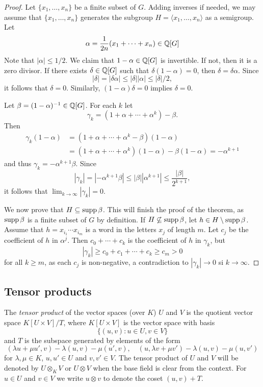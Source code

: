 \begin{proof}
	Let $\{x_1,\dots,x_n\}$ be a finite subset of $G$. Adding inverses if needed, we may assume that 
	$\{x_1,\dots,x_n\}$ generates the subgroup
	$H=\langle x_1,\dots,x_n\rangle$ as a semigroup. Let 
	\[
		\alpha=\frac{1}{2n}(x_1+\cdots+x_n)\in\mathbb{Q}[G]
	\]
    Note that $|\alpha|\leq 1/2$. 
	We claim that $1-\alpha\in\mathbb{Q}[G]$ is invertible. If not, then it is a zero divisor. If there exists 
	$\delta\in\mathbb{Q}[G]$ such that $\delta(1-\alpha)=0$, then 
	$\delta=\delta\alpha$. Since  
	\[
		|\delta|=|\delta\alpha|\leq|\delta||\alpha|\leq|\delta|/2,
	\]
	it follows that $\delta=0$. Similarly, $(1-\alpha)\delta=0$ implies
	$\delta=0$. 
	
	Let $\beta=(1-\alpha)^{-1}\in\mathbb{Q}[G]$.  For each $k$ let  
	\[
		\gamma_k=(1+\alpha+\cdots+\alpha^k)-\beta.
	\]
	Then 
	\begin{align*}
		\gamma_k(1-\alpha)&=(1+\alpha+\cdots+\alpha^k-\beta)(1-\alpha)\\
		&=(1+\alpha+\cdots+\alpha^k)(1-\alpha)-\beta(1-\alpha)=-\alpha^{k+1}
	\end{align*}
	and thus  
	$\gamma_k=-\alpha^{k+1}\beta$. Since  
	\[
		|\gamma_k|=|-\alpha^{k+1}\beta|\leq|\beta||\alpha^{k+1}|\leq\frac{|\beta|}{2^{k+1}},
	\]
	it follows that $\lim_{k\to\infty}|\gamma_k|=0$. 

	We now prove that $H\subseteq\operatorname{supp}\beta$. This will finish the proof of the theorem, 
	as $\operatorname{supp}\beta$ is a finite subset of $G$ by definition. If
	$H\not\subseteq\operatorname{supp}\beta$, let $h\in H\setminus\operatorname{supp}\beta$.  Assume that 
    $h=x_{i_1}\cdots x_{i_m}$ is a word in the letters $x_j$ of length $m$. Let 
    $c_j$ be the coefficient of $h$ in $\alpha^j$. Then $c_0+\cdots+c_k$ is the 
	coefficient of $h$ in $\gamma_k$, but 
	\[
		|\gamma_k|\geq c_0+c_1+\cdots+c_k\geq c_m>0
	\]
	for all $k\geq m$, as each $c_j$ is non-negative, a contradiction to 
	$|\gamma_k|\to 0$ si $k\to\infty$.
\end{proof}



\subsection{Tensor products}

The \emph{tensor product} of the vector spaces (over $K$) $U$ and $V$ 
is the quotient vector space $K[U\times V]/T$, where $K[U\times V]$ 
is the vector space with basis 
\[
\{(u,v):u\in U,v\in V\}
\]
and $T$ is the subspace 
generated by elements of the form 
\[
		(\lambda u+\mu u',v)-\lambda(u,v)-\mu(u',v),\quad
		(u,\lambda v+\mu v')-\lambda(u,v)-\mu(u,v')
	\]
for $\lambda,\mu\in K$, $u,u'\in U$ and $v,v'\in V$.
The tensor product of $U$ and $V$ will be denoted by $U\otimes_KV$ or 
$U\otimes V$ when the base field is clear from the context. For $u\in U$ and 
$v\in V$ we write $u\otimes v$ to denote the coset $(u,v)+T$.

